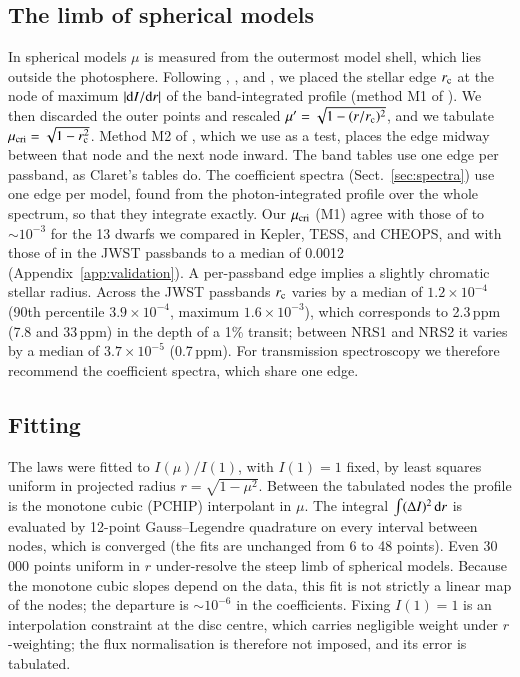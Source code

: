 \documentclass{aa}
\newcommand{\ppm}{\,\textrm{ppm}}
\begin{document}
\subsection{The limb of spherical models}\label{sec:limb}
In spherical models $\mu$ is measured from the outermost model shell, which
lies outside the photosphere. Following \citet{espinoza2015},
\citet{claret2017}, and \citet{claretsouthworth2023}, we placed the stellar
edge $r_{\rm c}$ at the node of maximum $|{\rm d}I/{\rm d}r|$ of the
band-integrated profile (method M1 of \citealt{claretsouthworth2023}). We then
discarded the outer points and rescaled $\mu'=\sqrt{1-(r/r_{\rm c})^2}$, and
we tabulate $\mu_{\rm cri}=\sqrt{1-r_{\rm c}^2}$. Method M2 of
\citet{claretsouthworth2023}, which we use as a test, places the edge midway
between that node and the next node inward. The band tables use one edge per
passband, as Claret's tables do. The coefficient spectra
(Sect.~\ref{sec:spectra}) use one edge per model, found from the
photon-integrated profile over the whole spectrum, so that they integrate
exactly. Our $\mu_{\rm cri}$ (M1) agree with those of
\citet{claretsouthworth2023} to $\sim10^{-3}$ for the 13 dwarfs we compared
in Kepler, TESS, and CHEOPS, and with those of \citet{claret2025} in the JWST
passbands to a median of 0.0012 (Appendix~\ref{app:validation}). A
per-passband edge implies a slightly chromatic stellar radius. Across the JWST
passbands $r_{\rm c}$ varies by a median of $1.2\times10^{-4}$ (90th
percentile $3.9\times10^{-4}$, maximum $1.6\times10^{-3}$), which corresponds
to 2.3\ppm{} (7.8 and 33\ppm) in the depth of a 1\% transit; between NRS1 and NRS2 it varies by a median of $3.7\times10^{-5}$ (0.7\ppm). For
transmission spectroscopy we therefore recommend the coefficient spectra,
which share one edge.

\subsection{Fitting}\label{sec:fitting}
The laws were fitted to $I(\mu)/I(1)$, with $I(1)=1$ fixed, by least squares
uniform in projected radius $r=\sqrt{1-\mu^2}$. Between the tabulated nodes
the profile is the monotone cubic (PCHIP) interpolant in $\mu$. The integral
$\int(\Delta I)^2\,{\rm d}r$ is evaluated by 12-point Gauss--Legendre
quadrature on every interval between nodes, which is converged (the fits are
unchanged from 6 to 48 points). Even 30\,000 points uniform in $r$
under-resolve the steep limb of spherical models. Because the monotone cubic
slopes depend on the data, this fit is not strictly a linear map of the nodes;
the departure is $\sim10^{-6}$ in the coefficients. Fixing $I(1)=1$ is an
interpolation constraint at the disc centre, which carries negligible weight
under $r$-weighting; the flux normalisation is therefore not imposed, and its
error is tabulated.
\end{document}
